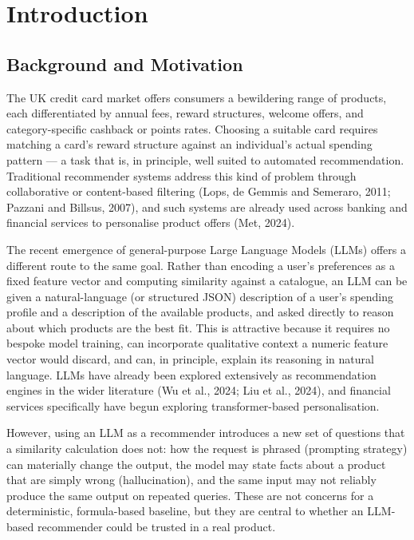 \chapter{Introduction}
\label{ch:introduction}

\section{Background and Motivation}

The UK credit card market offers consumers a bewildering range of products, each differentiated by annual fees, reward structures, welcome offers, and category-specific cashback or points rates. Choosing a suitable card requires matching a card's reward structure against an individual's actual spending pattern --- a task that is, in principle, well suited to automated recommendation. Traditional recommender systems address this kind of problem through collaborative or content-based filtering (Lops, de Gemmis and Semeraro, 2011; Pazzani and Billsus, 2007), and such systems are already used across banking and financial services to personalise product offers (Met, 2024).

The recent emergence of general-purpose Large Language Models (LLMs) offers a different route to the same goal. Rather than encoding a user's preferences as a fixed feature vector and computing similarity against a catalogue, an LLM can be given a natural-language (or structured JSON) description of a user's spending profile and a description of the available products, and asked directly to reason about which products are the best fit. This is attractive because it requires no bespoke model training, can incorporate qualitative context a numeric feature vector would discard, and can, in principle, explain its reasoning in natural language. LLMs have already been explored extensively as recommendation engines in the wider literature (Wu et al., 2024; Liu et al., 2024), and financial services specifically have begun exploring transformer-based personalisation.

However, using an LLM as a recommender introduces a new set of questions that a similarity calculation does not: how the request is phrased (prompting strategy) can materially change the output, the model may state facts about a product that are simply wrong (hallucination), and the same input may not reliably produce the same output on repeated queries. These are not concerns for a deterministic, formula-based baseline, but they are central to whether an LLM-based recommender could be trusted in a real product.

